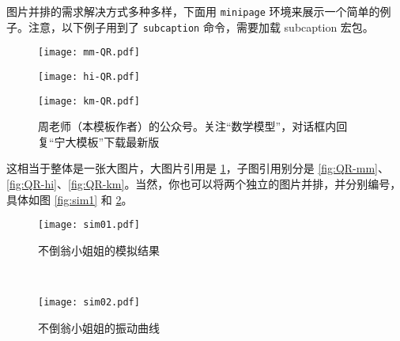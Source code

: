 图片并排的需求解决方式多种多样，下面用 \verb|minipage| 环境来展示一个简单的例子。注意，以下例子用到了 \verb|subcaption| 命令，需要加载 subcaption 宏包。
\begin{figure}[!htb]
    \centering
    \begin{minipage}[c]{0.32\textwidth}
        \centering
        \texttt{[image: mm-QR.pdf]}
        \label{fig:QR-mm}
    \end{minipage}
    \begin{minipage}[c]{0.32\textwidth}
        \centering
        \texttt{[image: hi-QR.pdf]}
        \label{fig:QR-hi}
    \end{minipage}
    \begin{minipage}[c]{0.32\textwidth}
        \centering
        \texttt{[image: km-QR.pdf]}
        \label{fig:QR-km}
    \end{minipage}
    \caption{周老师（本模板作者）的公众号。关注“数学模型”，对话框内回复“宁大模板”下载最新版}
    \label{fig:QR}
\end{figure}
这相当于整体是一张大图片，大图片引用是 \ref{fig:QR}，子图引用别分是 \ref{fig:QR-mm}、\ref{fig:QR-hi}、\ref{fig:QR-km}。当然，你也可以将两个独立的图片并排，并分别编号，具体如图 \ref{fig:sim1} 和 \ref{fig:sim2}。

\begin{figure}[!htb]
    \centering
    \begin{minipage}[c]{0.45\textwidth}
        \centering
        \texttt{[image: sim01.pdf]}
        \caption{不倒翁小姐姐的模拟结果}\label{fig:sim1}
    \end{minipage}
    \begin{minipage}[c]{0.075\textwidth}
         ~%
    \end{minipage}
    \begin{minipage}[c]{0.45\textwidth}
        \centering
        \texttt{[image: sim02.pdf]}
        \caption{不倒翁小姐姐的振动曲线}
        \label{fig:sim2}
    \end{minipage}
\end{figure}


